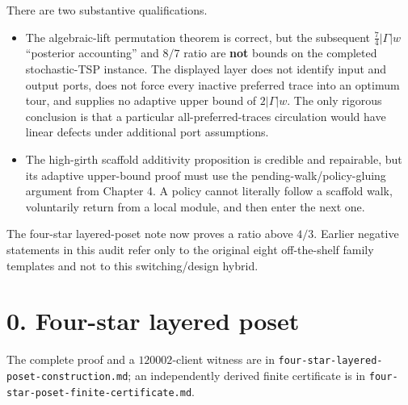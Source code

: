 \documentclass[11pt,a4paper]{article}
\begin{document}
There are two substantive qualifications.


\begin{itemize}

\item The algebraic-lift permutation theorem is correct, but the subsequent \(\tfrac74|\Gamma|w\) “posterior accounting” and \(8/7\) ratio are \textbf{not} bounds on the completed stochastic-TSP instance.  The displayed layer does not identify input and output ports, does not force every inactive preferred trace into an optimum tour, and supplies no adaptive upper bound of \(2|\Gamma|w\).  The only rigorous conclusion is that a particular all-preferred-traces circulation would have linear defects under additional port assumptions.

\item The high-girth scaffold additivity proposition is credible and repairable, but its adaptive upper-bound proof must use the pending-walk/policy-gluing argument from Chapter 4.  A policy cannot literally follow a scaffold walk, voluntarily return from a local module, and then enter the next one.

\end{itemize}

The four-star layered-poset note now proves a ratio above \(4/3\).  Earlier negative statements in this audit refer only to the original eight off-the-shelf family templates and not to this switching/design hybrid.


\section*{0. Four-star layered poset}

The complete proof and a \(120002\)-client witness are in \nolinkurl{four-star-layered-poset-construction.md}; an independently derived finite certificate is in \nolinkurl{four-star-poset-finite-certificate.md}.
\end{document}
